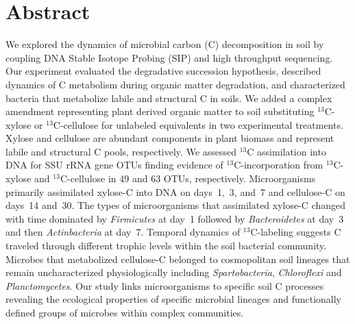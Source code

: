 \section{Abstract} We explored the dynamics of microbial carbon (C)
decomposition in soil by coupling DNA Stable Isotope Probing (SIP) and high
throughput sequencing. Our experiment evaluated the degradative succession
hypothesis, described dynamics of C metabolism during organic matter
degradation, and characterized bacteria that metabolize labile and
structural C in soils. We added a complex amendment representing plant
derived organic matter to soil substituting $^{13}$C-xylose
or $^{13}$C-cellulose for unlabeled equivalents in two experimental
treatments. Xylose and cellulose are abundant components in plant biomass
and represent labile and structural C pools, respectively. We assessed
$^{13}$C assimilation into DNA for SSU rRNA gene OTUs finding evidence of
$^{13}$C-incorporation from $^{13}$C-xylose and $^{13}$C-cellulose in 49
and 63 OTUs, respectively. Microorganisms primarily assimilated xylose-C
into DNA on days~1,~3, and~7 and cellulose-C on days~14 and~30. The types
of microorganisms that assimilated xylose-C changed with time 
dominated by \textit{Firmicutes} at day~1 followed by
\textit{Bacteroidetes} at day~3 and then \textit{Actinbacteria} at day~7.
Temporal dynamics of $^{13}$C-labeling suggests C traveled through different
trophic levels within the soil bacterial community. Microbes that metabolized
cellulose-C belonged to cosmopolitan soil lineages that remain uncharacterized
physiologically including \textit{Spartobacteria}, \textit{Chloroflexi} and
\textit{Planctomycetes}. Our study links microorganisms to specific soil
C processes revealing the ecological properties of specific microbial lineages
and functionally defined groups of microbes within complex communities.
